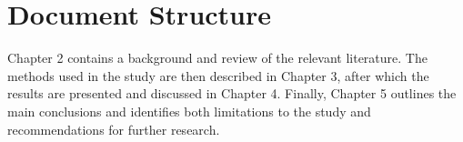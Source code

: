 \section{Document Structure}
Chapter 2 contains a background and review of the relevant literature.
The methods used in the study are then described in Chapter 3, after which the results are presented and discussed in Chapter 4.
Finally, Chapter 5 outlines the main conclusions and identifies both limitations to the study and recommendations for further research.
